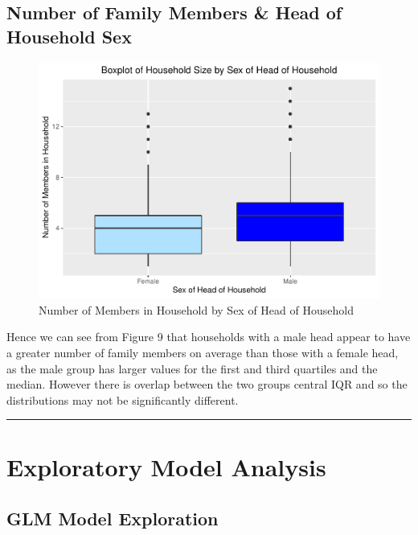 \documentclass[
]{article}
\begin{document}
\hypertarget{number-of-family-members-head-of-household-sex}{%
\subsection{Number of Family Members \& Head of Household
Sex}\label{number-of-family-members-head-of-household-sex}}

\begin{figure}[H]

{\centering \includegraphics[width=0.8\linewidth]{Group_01_Project2_demo_files/figure-latex/boxplot of sex and members-1} 

}

\caption{Number of Members in Household by Sex of Head of Household}\label{fig:boxplot of sex and members}
\end{figure}

Hence we can see from Figure 9 that households with a male head appear
to have a greater number of family members on average than those with a
female head, as the male group has larger values for the first and third
quartiles and the median. However there is overlap between the two
groups central IQR and so the distributions may not be significantly
different.

\begin{center}\rule{0.5\linewidth}{0.5pt}\end{center}

\newpage

\hypertarget{sec:EMA}{%
\section{Exploratory Model Analysis}\label{sec:EMA}}

\hypertarget{glm-model-exploration}{%
\subsection{GLM Model Exploration}\label{glm-model-exploration}}
\end{document}
